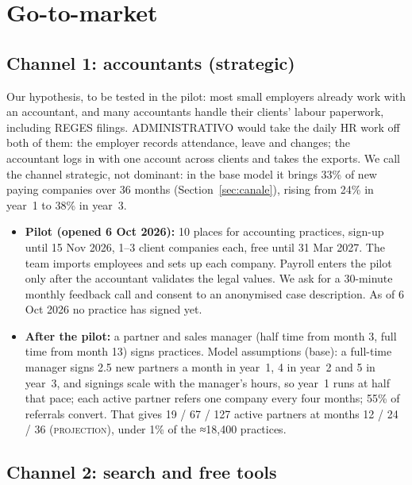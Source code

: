 \documentclass[10pt,a4paper]{article}
\newcommand{\proj}{\textcolor{brandTeal}{\textsc{projection}}}
\begin{document}
\section{Go-to-market}\label{sec:gtm}\nobreak

\subsection{Channel 1: accountants (strategic)}

Our hypothesis, to be tested in the pilot: most small employers already work with an accountant,
and many accountants handle their clients' labour paperwork, including REGES filings.
ADMINISTRATIVO would take the daily HR work off both of them: the employer records attendance,
leave and changes; the accountant logs in with one account across clients and takes the exports.
We call the channel strategic, not dominant: in the base model it brings 33\% of new paying
companies over 36 months (Section~\ref{sec:canale}), rising from 24\% in year~1 to 38\% in year~3.

\begin{itemize}
\item \textbf{Pilot (opened 6 Oct 2026):} 10 places for accounting practices, sign-up until 15 Nov
  2026, 1--3 client companies each, free until 31 Mar 2027. The team imports employees and sets up
  each company. Payroll enters the pilot only after the accountant validates the legal values. We
  ask for a 30-minute monthly feedback call and consent to an anonymised case description. As of
  6 Oct 2026 no practice has signed yet.
\item \textbf{After the pilot:} a partner and sales manager (half time from month 3, full time
  from month 13) signs practices. Model assumptions (base): a full-time manager signs 2.5 new partners
  a month in year~1, 4 in year~2 and 5 in year~3, and signings scale with the manager's hours, so
  year~1 runs at half that pace; each active partner refers one company every four months; 55\% of
  referrals convert. That gives 19 / 67 / 127 active partners at months 12 / 24 / 36 (\proj), under
  1\% of the ≈18,400 practices.
\end{itemize}

\subsection{Channel 2: search and free tools}
\end{document}
